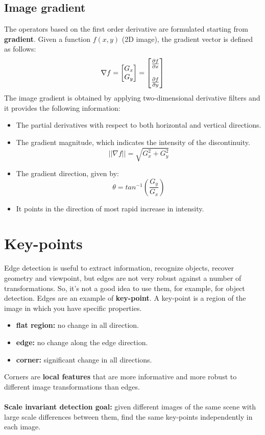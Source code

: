 \subsection{Image gradient}
The operators based on the first order derivative are formulated starting from \textbf{gradient}. Given a function $f(x,y)$ (2D image), the gradient vector is defined as follows:
\[
    \nabla f = 
    \begin{bmatrix}
        G_{x}\\
        G_{y}\\
    \end{bmatrix}
    =
    \begin{bmatrix}
        \frac{\partial f}{\partial x}\\
        \vspace{1pt}\\
        \frac{\partial f}{\partial y}\\
    \end{bmatrix}
\]
The image gradient is obtained by applying two-dimensional derivative filters and it provides the following information:
\begin{itemize}
    \item The partial derivatives with respect to both horizontal and vertical directions.
    \item The gradient magnitude, which indicates the intensity of the discontinuity.
    \[|| \nabla f || = \sqrt{G_{x}^{2} + G_{y}^{2}}\]
    \item The gradient direction, given by:
    \[ \theta = tan^{-1} \left (\frac{G_{y}}{G_{x}} \right)\]
    \item It points in the direction of most rapid increase in intensity.
\end{itemize}

\section{Key-points}
Edge detection is useful to extract information, recognize objects, recover geometry and viewpoint, but edges are not very robust against a number of transformations. So, it's not a good idea to use them, for example, for object detection.\newline\newline
Edges are an example of \textbf{key-point}. A key-point is a region of the image in which you have specific properties.
\begin{itemize}
    \item \textbf{flat region:} no change in all direction.
    \item \textbf{edge:} no change along the edge direction.
    \item \textbf{corner:} significant change in all directions.
\end{itemize}
Corners are \textbf{local features} that are more informative and more robust to different image transformations than edges.\\\\
\textbf{Scale invariant detection goal:} given different images of the same scene with large scale differences between them, find the same key-points independently in each image.


